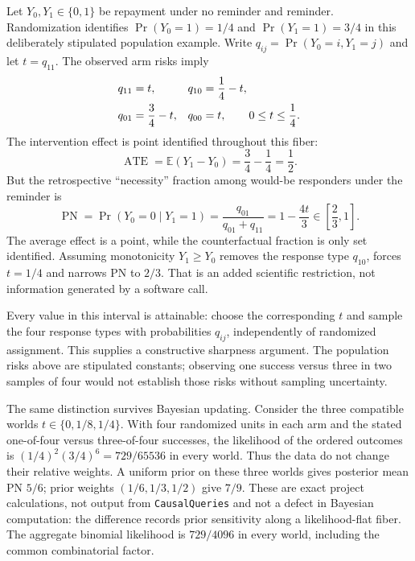 Let $Y_0,Y_1\in\{0,1\}$ be repayment under no reminder and reminder. Randomization identifies $\Pr(Y_0=1)=1/4$ and $\Pr(Y_1=1)=3/4$ in this deliberately stipulated population example. Write $q_{ij}=\Pr(Y_0=i,Y_1=j)$ and let $t=q_{11}$. The observed arm risks imply
\begin{align}
 q_{11}&=t, &q_{10}&=\frac14-t,\notag\\
 q_{01}&=\frac34-t, &q_{00}&=t,\qquad 0\leq t\leq\frac14. \label{exec18:r-fiber}
\end{align}
The intervention effect is point identified throughout this fiber:
\begin{equation}
 \operatorname{ATE}=\mathbb E(Y_1-Y_0)=\frac34-\frac14=\frac12.
 \label{exec18:r-ate}
\end{equation}
But the retrospective “necessity” fraction among would-be responders under the reminder is
\begin{equation}
 \operatorname{PN}=\Pr(Y_0=0\mid Y_1=1)
 =\frac{q_{01}}{q_{01}+q_{11}}=1-\frac{4t}{3}\in\left[\frac23,1\right].
 \label{exec18:r-pn}
\end{equation}
The average effect is a point, while the counterfactual fraction is only set identified. Assuming monotonicity $Y_1\geq Y_0$ removes the response type $q_{10}$, forces $t=1/4$ and narrows PN to $2/3$. That is an added scientific restriction, not information generated by a software call.

Every value in this interval is attainable: choose the corresponding $t$ and sample the four response types with probabilities $q_{ij}$, independently of randomized assignment. This supplies a constructive sharpness argument. The population risks above are stipulated constants; observing one success versus three in two samples of four would not establish those risks without sampling uncertainty.

The same distinction survives Bayesian updating. Consider the three compatible worlds $t\in\{0,1/8,1/4\}$. With four randomized units in each arm and the stated one-of-four versus three-of-four successes, the likelihood of the ordered outcomes is $(1/4)^2(3/4)^6=729/65536$ in every world. Thus the data do not change their relative weights. A uniform prior on these three worlds gives posterior mean PN $5/6$; prior weights $(1/6,1/3,1/2)$ give $7/9$. These are exact project calculations, not output from \texttt{CausalQueries} and not a defect in Bayesian computation: the difference records prior sensitivity along a likelihood-flat fiber. The aggregate binomial likelihood is $729/4096$ in every world, including the common combinatorial factor.

